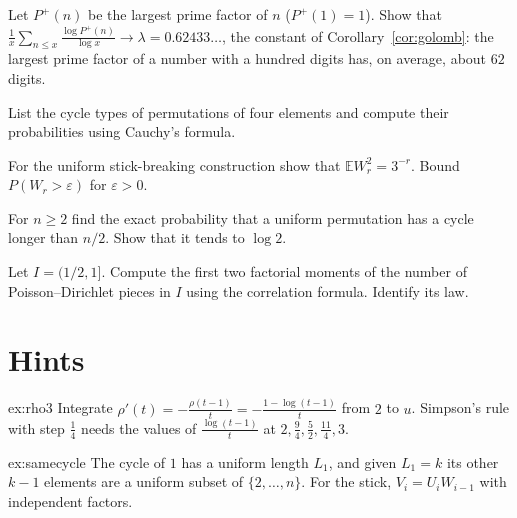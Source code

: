 \begin{exercise}[$\star\star$]\label{ex:meanlargest}
Let $P^+(n)$ be the largest prime factor of $n$ ($P^+(1)=1$). Show that $\frac1x\sum_{n\le x}\frac{\log P^+(n)}{\log x}\to\lambda=0.62433\ldots$, the constant of Corollary~\ref{cor:golomb}: the largest prime factor of a number with a hundred digits has, on average, about $62$ digits.
\end{exercise}

\begin{exercise}[$\star$]\label{ex:v11-ch12-types}
List the cycle types of permutations of four elements and compute their probabilities using Cauchy's formula.
\end{exercise}

\begin{exercise}[$\star\star$]\label{ex:v11-ch12-remaining}
For the uniform stick-breaking construction show that $\mathbb EW_r^2=3^{-r}$. Bound $P(W_r>\varepsilon)$ for $\varepsilon>0$.
\end{exercise}

\begin{exercise}[$\star\star$]\label{ex:v11-ch12-long-cycle}
For $n\ge2$ find the exact probability that a uniform permutation has a cycle longer than $n/2$. Show that it tends to $\log2$.
\end{exercise}

\begin{exercise}[$\star\star$]\label{ex:v11-ch12-factorial-count}
Let $I=(1/2,1]$. Compute the first two factorial moments of the number of Poisson--Dirichlet pieces in $I$ using the correlation formula. Identify its law.
\end{exercise}

\section{Hints}

\begin{hint}{ex:rho3}
Integrate $\rho'(t)=-\frac{\rho(t-1)}t=-\frac{1-\log(t-1)}t$ from $2$ to $u$. Simpson's rule with step $\frac14$ needs the values of $\frac{\log(t-1)}t$ at $2,\frac94,\frac52,\frac{11}4,3$.
\end{hint}

\begin{hint}{ex:samecycle}
The cycle of $1$ has a uniform length $L_1$, and given $L_1=k$ its other $k-1$ elements are a uniform subset of $\{2,\dots,n\}$. For the stick, $V_i=U_iW_{i-1}$ with independent factors.
\end{hint}

